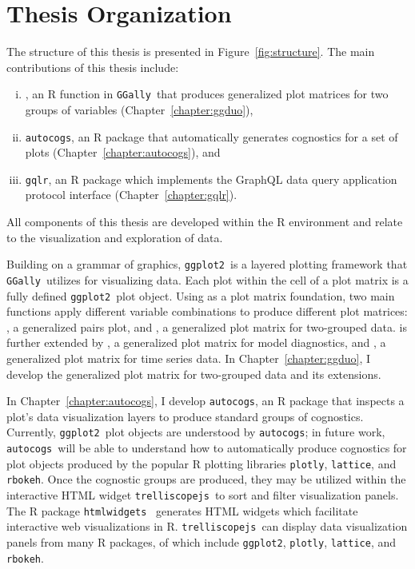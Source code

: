 \documentclass[stat,dissertation]{puthesis}\usepackage[]{graphicx}\usepackage{xcolor}
\newcommand{\pkg}[1]{\texttt{#1}}
\newcommand{\ggplot}{\pkg{ggplot2}}
\newcommand{\trelliscopejs}{\pkg{trelliscopejs}}
\newcommand{\autocogs}{\pkg{autocogs}}
\newcommand{\gqlr}{\pkg{gqlr}}
\newcommand{\GGally}{\pkg{GGally}}
\begin{document}
%
%
%
%
%
%
%
\section{Thesis Organization}

The structure of this thesis is presented in Figure~\ref{fig:structure}.
The main contributions of this thesis include:
\begin{enumerate}[i)]
  \item {}, an R function in \GGally~that produces generalized plot matrices for two groups of variables (Chapter~\ref{chapter:ggduo}),
  \item \autocogs, an R package that automatically generates cognostics for a set of plots  (Chapter~\ref{chapter:autocogs}), and
  \item \gqlr, an R package which implements the GraphQL data query application protocol interface (Chapter~\ref{chapter:gqlr}).
\end{enumerate}

All components of this thesis are developed within the R environment and relate to the visualization and exploration of data.

Building on a grammar of graphics, \ggplot~is a layered plotting framework that \GGally~utilizes for visualizing data.  Each plot within the cell of a  plot matrix is a fully defined \ggplot~plot object.  Using  as a plot matrix foundation, two main functions apply different variable combinations to produce different plot matrices: , a generalized pairs plot, and , a generalized plot matrix for two-grouped data.   is further extended by , a generalized plot matrix for model diagnostics, and , a generalized plot matrix for time series data.  In Chapter~\ref{chapter:ggduo}, I develop the generalized plot matrix for two-grouped data and its extensions.

In Chapter~\ref{chapter:autocogs}, I develop \autocogs, an R package that inspects a plot's data visualization layers to produce standard groups of cognostics.  Currently, \ggplot~plot objects are understood by \autocogs; in future work, \autocogs~will be able to understand how to automatically produce cognostics for plot objects produced by the popular R plotting libraries \pkg{plotly}, \pkg{lattice}, and \pkg{rbokeh}.  Once the cognostic groups are produced, they may be utilized within the interactive HTML widget \trelliscopejs~to sort and filter visualization panels.  The R package \pkg{htmlwidgets}~\cite{r_htmlwidgets} generates HTML widgets which facilitate interactive web visualizations in R.
\trelliscopejs~can display data visualization panels from many R packages, of which include \ggplot, \pkg{plotly}, \pkg{lattice}, and \pkg{rbokeh}.
\end{document}
